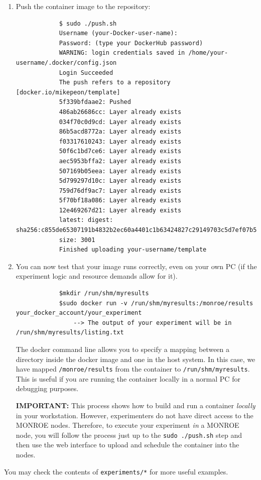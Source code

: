 \documentclass[a4paper,10pt]{article}
\newcommand{\VerbatimFont}{\footnotesize}
\newcommand{\monroe}{MONROE}
\newcommand{\identifier}[1]{{\texttt{\small{#1}}}}
\begin{document}
\begin{enumerate}
	\item Push the container image to the repository:
		{\VerbatimFont\begin{verbatim}
			$ sudo ./push.sh
			Username (your-Docker-user-name):
			Password: (type your DockerHub password)
			WARNING: login credentials saved in /home/your-username/.docker/config.json
			Login Succeeded
			The push refers to a repository [docker.io/mikepeon/template]
			5f339bfdaae2: Pushed
			486ab26686cc: Layer already exists
			034f70c0d9cd: Layer already exists
			86b5acd8772a: Layer already exists
			f03317610243: Layer already exists
			50f6c1bd7ce6: Layer already exists
			aec5953bffa2: Layer already exists
			507169b05eea: Layer already exists
			5d799297d10c: Layer already exists
			759d76df9ac7: Layer already exists
			5f70bf18a086: Layer already exists
			12e469267d21: Layer already exists
			latest: digest: sha256:c855de65307191b4832b2ec60a4401c1b63424827c29149703c5d7ef07b519f7
			size: 3001
			Finished uploading your-username/template
		\end{verbatim}}
	\item You can now test that your image runs correctly, even on your own PC (if the experiment logic and resource demands allow for it).
		{\VerbatimFont\begin{verbatim}
			$mkdir /run/shm/myresults
			$sudo docker run -v /run/shm/myresults:/monroe/results your_docker_account/your_experiment
			    --> The output of your experiment will be in /run/shm/myresults/listing.txt
		\end{verbatim}}
		The docker command line allows you to specify a mapping between a directory inside the docker image and one in the host system.
		In this case, we have mapped \identifier{/monroe/results} from the container to \identifier{/run/shm/my\-results}.
		This is useful if you are running the container locally in a normal PC for debugging purposes.
		
		\textbf{IMPORTANT:} This process shows how to build and run a container \emph{locally} in your workstation.
		However, experimenters do not have direct access to the \monroe{} nodes.
		Therefore, to execute your experiment \emph{in} a \monroe{} node, you will follow the process just up to the \identifier{sudo ./push.sh} step and then use the web interface to upload and schedule the container into the nodes.
\end{enumerate}

You may check the contents of \identifier{experiments/*} for more useful examples.
\end{document}
